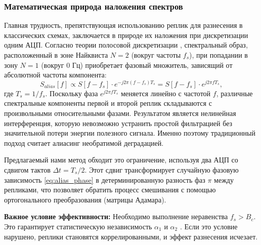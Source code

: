 \documentclass[a4paper,12pt]{article}
\numberwithin{equation}{section}
\begin{document}
\subsubsection*{Математическая природа наложения спектров}
Главная трудность, препятствующая использованию реплик для разнесения в классических схемах, заключается в природе их наложения при дискретизации одним АЦП. Согласно теории полосовой дискретизации \cite{vaughan,harris,vaidyanathan}, спектральный образ, расположенный в зоне Найквиста $N=2$ (вокруг частоты $f_s$), при попадании в зону $N=1$ (вокруг 0 Гц) приобретает фазовый множитель, зависящий от абсолютной частоты компонента:
\begin{equation}
S_{alias}[f] \propto S[f - f_s] \cdot e^{-j 2 \pi (f-f_s) T_s} = S[f - f_s] \cdot e^{j 2 \pi f T_s},
\label{eq:alias_phase}
\end{equation}
где $T_s = 1/f_s$. Поскольку фаза $e^{j 2 \pi f T_s}$ меняется линейно с частотой $f$, различные спектральные компоненты первой и второй реплик складываются с произвольными относительными фазами. Результатом является нелинейная интерференция, которую невозможно устранить простой фильтрацией без значительной потери энергии полезного сигнала. Именно поэтому традиционный подход считает алиасинг необратимой деградацией.

Предлагаемый нами метод обходит это ограничение, используя два АЦП со сдвигом тактов $\Delta t = T_s/2$. Этот сдвиг трансформирует случайную фазовую зависимость \eqref{eq:alias_phase} в детерминированную разность фаз $\pi$ между репликами, что позволяет обратить процесс смешивания с помощью ортогонального преобразования (матрицы Адамара).

\textbf{Важное условие эффективности:} Необходимо выполнение неравенства $f_s > B_c$. Это гарантирует статистическую независимость $\alpha_1$ и $\alpha_2$ \cite{goldsmith}. Если это условие нарушено, реплики становятся коррелированными, и эффект разнесения исчезает.
\end{document}
